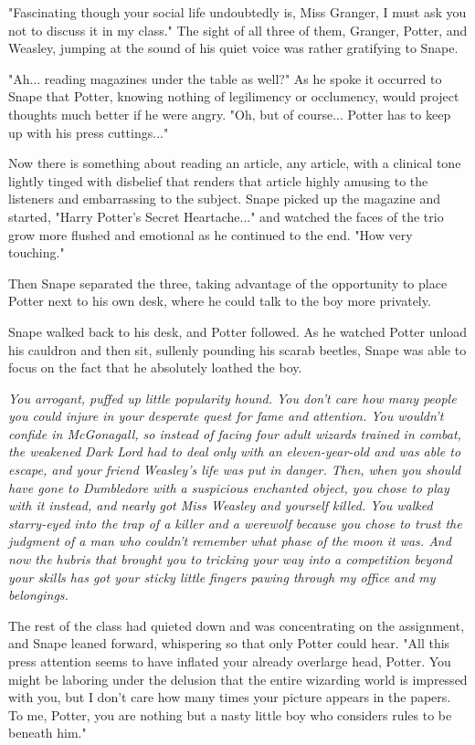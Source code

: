 "Fascinating though your social life undoubtedly is, Miss Granger, I must ask you not to discuss it in my class." The sight of all three of them, Granger, Potter, and Weasley, jumping at the sound of his quiet voice was rather gratifying to Snape.

"Ah... reading magazines under the table as well?" As he spoke it occurred to Snape that Potter, knowing nothing of legilimency or occlumency, would project thoughts much better if he were angry. "Oh, but of course... Potter has to keep up with his press cuttings..."

Now there is something about reading an article, any article, with a clinical tone lightly tinged with disbelief that renders that article highly amusing to the listeners and embarrassing to the subject. Snape picked up the magazine and started, "Harry Potter's Secret Heartache..." and watched the faces of the trio grow more flushed and emotional as he continued to the end. "How very touching."

Then Snape separated the three, taking advantage of the opportunity to place Potter next to his own desk, where he could talk to the boy more privately.

Snape walked back to his desk, and Potter followed. As he watched Potter unload his cauldron and then sit, sullenly pounding his scarab beetles, Snape was able to focus on the fact that he absolutely loathed the boy.

\emph{You arrogant, puffed up little popularity hound. You don't care how many people you could injure in your desperate quest for fame and attention. You wouldn't confide in McGonagall, so instead of facing four adult wizards trained in combat, the weakened Dark Lord had to deal only with an eleven-year-old and was able to escape, and your friend Weasley's life was put in danger. Then, when you should have gone to Dumbledore with a suspicious enchanted object, you chose to play with it instead, and nearly got Miss Weasley and yourself killed. You walked starry-eyed into the trap of a killer and a werewolf because you chose to trust the judgment of a man who couldn't remember what phase of the moon it was. And now the hubris that brought you to tricking your way into a competition beyond your skills has got your sticky little fingers pawing through my office and my belongings.}

The rest of the class had quieted down and was concentrating on the assignment, and Snape leaned forward, whispering so that only Potter could hear. "All this press attention seems to have inflated your already overlarge head, Potter. You might be laboring under the delusion that the entire wizarding world is impressed with you, but I don't care how many times your picture appears in the papers. To me, Potter, you are nothing but a nasty little boy who considers rules to be beneath him."

